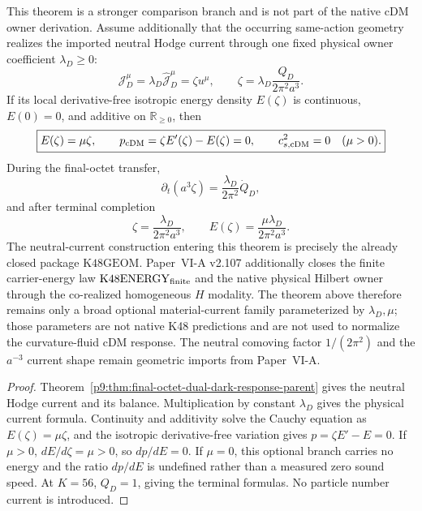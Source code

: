 \documentclass[12pt,a4paper]{article}
\begin{document}
\begin{theorem}
\label{p9:thm:k48-effective-dust-propagation}
This theorem is a stronger comparison branch and is not part of the native cDM
owner derivation.  Assume additionally that the occurring same-action geometry
realizes the imported neutral
Hodge current through one fixed physical owner coefficient \(\lambda_D\geq0\):
\begin{equation}
 \label{p9:eq:k48-physical-current-owner-map}
 \mathcal J_D^\mu
 =\lambda_D\widehat{\mathcal J}_D^\mu
 =\zeta u^\mu,
 \qquad
 \boxed{\zeta=\lambda_D\frac{Q_D}{2\pi^2a^3}}.
\end{equation}
If its local derivative-free isotropic energy density \(E(\zeta)\) is
continuous, \(E(0)=0\), and additive on \(\mathbb R_{\ge0}\), then
\begin{equation}
\label{p9:eq:k48-effective-dust-law}
\boxed{
E(\zeta)=\mu\zeta,
\qquad
p_{\rm cDM}=\zeta E'(\zeta)-E(\zeta)=0,
\qquad c_{s,{\rm cDM}}^2=0\quad(\mu>0).}
\end{equation}
During the final-octet transfer,
\begin{equation}
 \partial_t(a^3\zeta)=\frac{\lambda_D}{2\pi^2}\dot Q_D,
\end{equation}
and after terminal completion
\begin{equation}
 \label{p9:eq:k48-terminal-physical-dust-law}
 \boxed{
 \zeta=\frac{\lambda_D}{2\pi^2a^3},
 \qquad
 E(\zeta)=\frac{\mu\lambda_D}{2\pi^2a^3}.}
\end{equation}
The neutral-current construction entering this theorem is precisely the already
closed package \(\mathrm{K48GEOM}\).  Paper~VI-A v2.107 additionally closes
the finite carrier-energy law \(\mathrm{K48ENERGY}_{\rm finite}\) and the
native physical Hilbert owner through the co-realized homogeneous $H$ modality.
The theorem above therefore remains only a broad optional material-current
family parameterized by \(\lambda_D,\mu\); those parameters are not native K48
predictions and are not used to normalize the curvature-fluid cDM response.
The neutral comoving factor \(1/(2\pi^2)\) and the \(a^{-3}\) current shape
remain geometric imports from Paper~VI-A.
\end{theorem}

\begin{proof}
Theorem~\ref{p9:thm:final-octet-dual-dark-response-parent} gives the neutral
Hodge current and its balance.  Multiplication by constant \(\lambda_D\)
gives the physical current formula.  Continuity and additivity solve the
Cauchy equation as \(E(\zeta)=\mu\zeta\), and the isotropic derivative-free
variation gives \(p=\zeta E'-E=0\). If \(\mu>0\), \(dE/d\zeta=\mu>0\),
so \(dp/dE=0\). If \(\mu=0\), this optional branch carries no energy and
the ratio \(dp/dE\) is undefined rather than a measured zero sound speed.  At \(K=56\),
\(Q_D=1\), giving the terminal formulas.  No particle number current is
introduced.
\end{proof}
\end{document}

